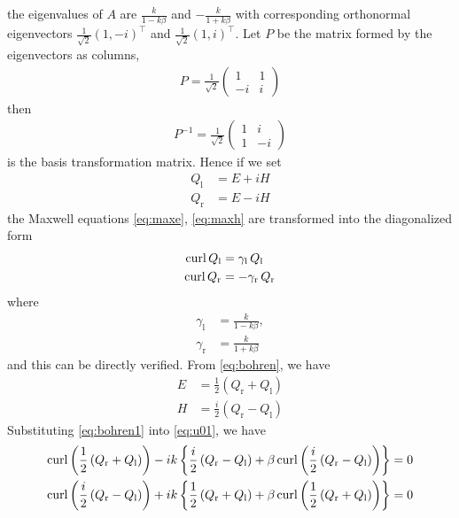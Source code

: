 the eigenvalues of $A$ are $\frac{k}{1 - k\beta}$ and $-\frac{k}{1 + k\beta}$ with corresponding orthonormal eigenvectors $\frac{1}{\sqrt{2}}(1, -i)^\top$ and $\frac{1}{\sqrt{2}}(1, i)^\top$. Let $P$ be the matrix formed by the eigenvectors as columns,
\begin{align*}
  P = \frac{1}{\sqrt{2}}\begin{pmatrix}1 & 1 \\ -i & i\end{pmatrix}
\end{align*}
then 
\begin{align*}
  P^{-1} = \frac{1}{\sqrt{2}}\begin{pmatrix}1 & i \\ 1 & -i\end{pmatrix}
\end{align*}
is the basis transformation matrix. Hence if we set
\begin{equation}\label{eq:bohren}
\begin{split}
  Q_\text{l} &= E + iH \\
  Q_\text{r} &= E - iH
\end{split}
\end{equation}
the Maxwell equations \eqref{eq:maxe}, \eqref{eq:maxh} are transformed into the diagonalized form
\begin{align}\label{eq:qlr} 
  \operatorname{curl} Q_\text{l} &= \gamma_\text{l}\,Q_\text{l}\\
  \operatorname{curl} Q_\text{r} &= -\gamma_\text{r}\,Q_\text{r}
\end{align}
where
\begin{equation}
\begin{split}\label{eq:glr}
  \gamma_\text{l} &= \frac{k}{1 - k\beta},\\
  \gamma_\text{r} &= \frac{k}{1 + k\beta}
\end{split}
\end{equation}
and this can be directly verified. From \eqref{eq:bohren}, we have 
\begin{equation}\label{eq:bohren1}
\begin{split}
  E &= \frac{1}{2}\left(Q_\text{r} + Q_\text{l}\right) \\
  H &= \frac{i}{2}\left(Q_\text{r} - Q_\text{l}\right)
\end{split}
\end{equation}
Substituting \eqref{eq:bohren1} into \eqref{eq:u01}, we have
\begin{align*}
  \operatorname{curl}\left(\frac{1}{2}\left(Q_\text{r} + Q_\text{l}\right)\right) - ik\left\{\frac{i}{2}\left(Q_\text{r} - Q_\text{l}\right)+\beta\operatorname{curl}\left(\frac{i}{2}\left(Q_\text{r} - Q_\text{l}\right)\right)\right\} &= 0 \\
  \operatorname{curl}\left(\frac{i}{2}\left(Q_\text{r} - Q_\text{l}\right)\right) + ik\left\{\frac{1}{2}\left(Q_\text{r} + Q_\text{l}\right)+\beta\operatorname{curl}\left(\frac{1}{2}\left(Q_\text{r} + Q_\text{l}\right)\right)\right\} &= 0
\end{align*}
